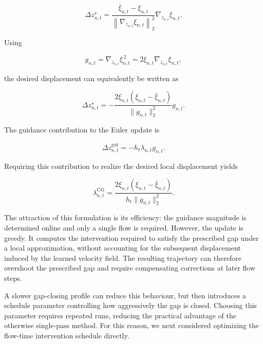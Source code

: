 \begin{equation}
    \Delta z_{n,t}^{\star}
    =
    \frac{
        \bar{\xi}_{n,t}-\xi_{n,t}
    }{
        \left\|
            \nabla_{z_{n,t}}\xi_{n,t}
        \right\|_2^2
    }
    \nabla_{z_{n,t}}\xi_{n,t}.
    \label{eq:app-close-gap-minimum-shift}
\end{equation}

Using

\begin{equation}
    g_{n,t}
    =
    \nabla_{z_{n,t}}\xi_{n,t}^{\,2}
    =
    2\xi_{n,t}
    \nabla_{z_{n,t}}\xi_{n,t},
\end{equation}

the desired displacement can equivalently be written as

\begin{equation}
    \Delta z_{n,t}^{\star}
    =
    -
    \frac{
        2\xi_{n,t}
        \left(
            \xi_{n,t}-\bar{\xi}_{n,t}
        \right)
    }{
        \lVert g_{n,t}\rVert_2^2
    }
    g_{n,t}.
\end{equation}

The guidance contribution to the Euler update is

\begin{equation}
    \Delta z_{n,t}^{\mathrm{gui}}
    =
    -h_t\lambda_{n,t}g_{n,t}.
\end{equation}

Requiring this contribution to realize the desired local displacement yields

\begin{equation}
    \lambda_{n,t}^{\mathrm{CG}}
    =
    \frac{
        2\xi_{n,t}
        \left(
            \xi_{n,t}-\bar{\xi}_{n,t}
        \right)
    }{
        h_t
        \lVert g_{n,t}\rVert_2^2
    }.
    \label{eq:app-close-gap-lambda}
\end{equation}

The attraction of this formulation is its efficiency: the guidance magnitude
is determined online and only a single flow is required. However, the update
is greedy. It computes the intervention required to satisfy the prescribed gap
under a local approximation, without accounting for the subsequent displacement
induced by the learned velocity field. The resulting trajectory can therefore
overshoot the prescribed gap and require compensating corrections at later
flow steps.

A slower gap-closing profile can reduce this behaviour, but then introduces a
schedule parameter controlling how aggressively the gap is closed. Choosing
this parameter requires repeated runs, reducing the practical advantage of the
otherwise single-pass method. For this reason, we next considered optimizing
the flow-time intervention schedule directly.


